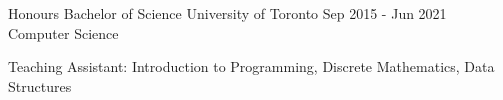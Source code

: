 
\begin{cventries}
  \cventry
    {Honours Bachelor of Science}
    {University of Toronto}
    {}
    {Sep 2015 - Jun 2021}
    {Computer Science}
    {
      \begin{cvitems}
        \item {Teaching Assistant: Introduction to Programming, Discrete Mathematics, Data Structures}
      \end{cvitems}
    }
\end{cventries}
